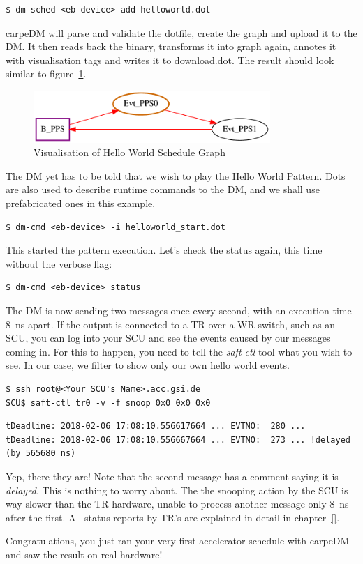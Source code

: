 \begin{lstlisting}[style = customshell]
$ dm-sched <eb-device> add helloworld.dot
\end{lstlisting}
carpeDM will parse and validate the dotfile, create the graph and upload it to the DM. It then reads back the binary, transforms it into graph again, annotes it with visualisation tags and writes it to download.dot.
The result should look similar to figure~\ref{fig:hello}.
%
\begin{figure}[H]
   \centering
   \def\svgwidth{0.5\textwidth}
   \includegraphics*[width=0.8\textwidth,keepaspectratio]{Figures/helloworld}
   \caption{Visualisation of Hello World Schedule Graph }
   \label{fig:hello}
\end{figure}
%
The DM yet has to be told that we wish to play the Hello World Pattern. Dots are also used to describe runtime commands to the DM,
and we shall use prefabricated ones in this example.
%
\begin{lstlisting}[style = customshell]
$ dm-cmd <eb-device> -i helloworld_start.dot
\end{lstlisting}
%
This started the pattern execution. Let's check the status again, this time without the verbose flag:
%
\begin{lstlisting}[style = customshell]
$ dm-cmd <eb-device> status
\end{lstlisting}
%
The DM is now sending two messages once every second, with an execution time \SI{8}{\nano\second} apart.
If the output is connected to a TR over a WR switch, such as an SCU, you can log into your SCU and see the events caused by our messages coming in.
For this to happen, you need to tell the \emph{saft-ctl} tool what you wish to see. In our case, we filter to show only our own hello world events.
%
\begin{lstlisting}[style = customshell]
$ ssh root@<Your SCU's Name>.acc.gsi.de
SCU$ saft-ctl tr0 -v -f snoop 0x0 0x0 0x0
\end{lstlisting}
%
\begin{lstlisting}[style = customshell]
tDeadline: 2018-02-06 17:08:10.556617664 ... EVTNO:  280 ...
tDeadline: 2018-02-06 17:08:10.556667664 ... EVTNO:  273 ... !delayed (by 565680 ns)
\end{lstlisting}
%
Yep, there they are! Note that the second message has a comment saying it is \emph{delayed}.
This is nothing to worry about. The the snooping action by the SCU is way slower than the TR hardware, unable to process another message only \SI{8}{\nano\second} after the first.
All status reports by TR's are explained in detail in chapter~\ref{}.
\par
\noindent
Congratulations, you just ran your very first accelerator schedule with carpeDM and saw the result on real hardware!




